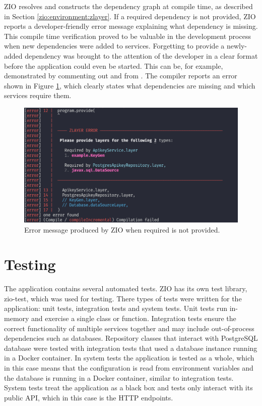 ZIO resolves and constructs the dependency graph at compile time, as described in Section \ref{zio:environment:zlayer}. If a required dependency is not provided, ZIO reports a developer-friendly error message explaining what dependency is missing. This compile time verification proved to be valuable in the development process when new dependencies were added to services. Forgetting to provide a newly-added dependency was brought to the attention of the developer in a clear format before the application could even be started. This can be, for example, demonstrated by commenting out  and  from . The compiler reports an error shown in Figure \ref{fig:zlayer-provide-error}, which clearly states what dependencies are missing and which services require them.



\begin{figure}[ht!]
    \centering
    \includegraphics[width=\textwidth]{images/zlayer-provide-error.png}
    \caption{Error message produced by ZIO when required  is not provided.}
    \label{fig:zlayer-provide-error}
\end{figure}


\section{Testing}
The application contains several automated tests. ZIO has its own test library, zio-test, which was used for testing. There types of tests were written for the application: unit tests, integration tests and system tests. Unit tests run in-memory and exercise a single class or function. Integration tests ensure the correct functionality of multiple services together and may include out-of-process dependencies such as databases. Repository classes that interact with PostgreSQL database were tested with integration tests that used a database instance running in a Docker container. In system tests the application is tested as a whole, which in this case means that the configuration is read from environment variables and the database is running in a Docker container, similar to integration tests. System tests treat the application as a black box and tests only interact with its public API, which in this case is the HTTP endpoints.

